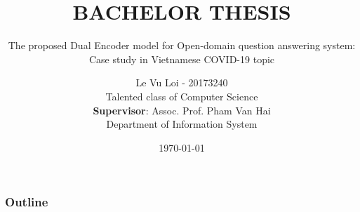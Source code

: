 \documentclass[11pt]{beamer}
\def\mydate{\leavevmode\hbox{\bfseries\the\day/\twodigits\month/\twodigits\year}}
\def\twodigits#1{\ifnum#1<10 0\fi\the#1}
\begin{document}
\captionsenglish
\dateUSenglish
\author[Le Vu Loi]{
	\begin{center}
		{\fontsize{14pt}{\baselineskip}\selectfont Le Vu Loi - 20173240} \\[10pt]
		{\fontsize{12pt}{\baselineskip}\selectfont Talented class of Computer Science} \\[25pt]
		\textbf{Supervisor}: Assoc. Prof. Pham Van Hai\\
		Department of Information System
	\end{center}
%		
}
\title[]{\bfseries\fontsize{14}{\baselineskip}\selectfont BACHELOR THESIS\vspace{5pt}}
\subtitle{The proposed Dual Encoder model for Open-domain
	question answering system: Case study in Vietnamese
	COVID-19 topic}
\date[\mydate]{\today}

\begin{frame}[plain]
	\maketitle
\end{frame}
\begin{frame}[plain]
\frametitle{Outline}
\begin{columns}[t]
	\begin{column}{.5\textwidth}
		\tableofcontents[sections={1-3}]
	\end{column}
	\begin{column}{.5\textwidth}
		\tableofcontents[sections={4-6}]
	\end{column}
\end{columns}
\end{frame}
\end{document}
